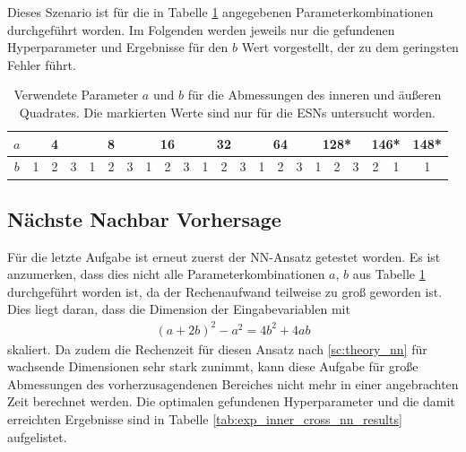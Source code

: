 Dieses Szenario ist für die in Tabelle \ref{tab:exp_inner_cross_pred_parameter} angegebenen Parameterkombinationen durchgeführt worden. Im Folgenden werden jeweils nur die gefundenen Hyperparameter und Ergebnisse für den $b$ Wert vorgestellt, der zu dem geringsten Fehler führt.

\begin{table}[h]
	\centering
	\begin{tabular}{cccc|ccc|ccc|ccc|ccc|ccc|cc|c}
		\hline
		$a$ & \multicolumn{3}{c|}{4} & \multicolumn{3}{c|}{8} & \multicolumn{3}{c|}{16} & \multicolumn{3}{c|}{32} & \multicolumn{3}{c|}{64} & \multicolumn{3}{c|}{128*} & \multicolumn{2}{c|}{146*} & 148* \\
		\hline
		$b$ & 1 & 2 & 3 & 1 & 2 & 3 & 1 & 2 & 3 & 1 & 2 & 3 & 1 & 2 & 3 & 1 & 2 & 3 & 2 & 1 & 1 \\
		\hline
	\end{tabular} 
	\caption{Verwendete Parameter $a$ und $b$ für die Abmessungen des inneren und äußeren Quadrates. Die markierten Werte sind nur für die \textsc{ESN}s untersucht worden.}
	\label{tab:exp_inner_cross_pred_parameter}
\end{table} 

\subsection{Nächste Nachbar Vorhersage}
Für die letzte Aufgabe ist erneut zuerst der \textsc{NN}-Ansatz getestet worden. Es ist anzumerken, dass dies nicht alle Parameterkombinationen $a$, $b$ aus Tabelle \ref{tab:exp_inner_cross_pred_parameter} durchgeführt worden ist, da der Rechenaufwand teilweise zu groß geworden ist. Dies liegt daran, dass die Dimension der Eingabevariablen mit
\begin{align*}
(a+2b)^2-a^2 = 4b^2+4ab
\end{align*}
skaliert. Da zudem die Rechenzeit für diesen Ansatz nach \ref{sc:theory_nn} für wachsende Dimensionen sehr stark zunimmt, kann diese Aufgabe für große Abmessungen des vorherzusagendenen Bereiches nicht mehr in einer angebrachten Zeit berechnet werden.
Die optimalen gefundenen Hyperparameter und die damit erreichten Ergebnisse sind in Tabelle \ref{tab:exp_inner_cross_nn_results} aufgelistet.

